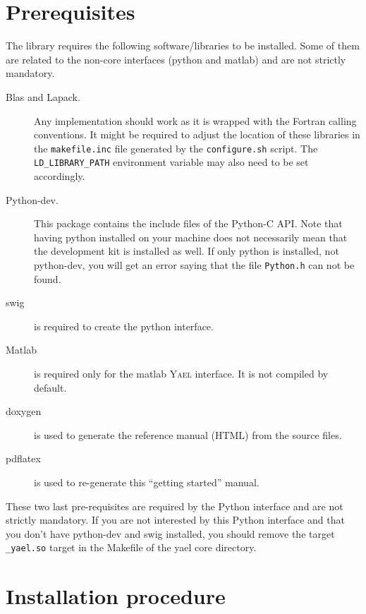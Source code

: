 \documentclass[a4paper,11pt,notitlepage,final,twoside]{report}
\newcommand{\yael}{\textsc{Yael}\xspace}
\newcommand{\tc}[1]{\texttt{#1}}
\begin{document}
\section{Prerequisites}

The library requires the following software/libraries to be installed. 
Some of them are related to the non-core interfaces (python and matlab) 
and are not strictly mandatory. 

\begin{description}
\item [Blas and Lapack.] Any implementation should work as it is
wrapped with the Fortran calling conventions. 
It might be required to adjust the location of these libraries in 
the \tc{makefile.inc} file generated by the \tc{configure.sh} script. 
The \tc{LD\_LIBRARY\_PATH} environment variable may also need to be set accordingly. 

\item [Python-dev.] This package contains the include files of the Python-C API. 
Note that having python installed on your machine does not necessarily 
mean that the development kit is installed as well. 
If only python is installed, not python-dev, you will get an error 
saying that the file \tc{Python.h} can not be found. 

\item [swig] 
is required to create the python interface. 

\item [Matlab] is required only for the matlab \yael interface. 
It is not compiled by default. 

\item [doxygen] is used to generate the reference manual (HTML) from the source files. 

\item [pdflatex] is used to re-generate this ``getting started'' manual. 
\end{description}


These two last pre-requisites are required by the Python interface 
and are not strictly mandatory. If you are not interested by this 
Python interface and that you don't have python-dev and swig installed, 
you should remove the target \tc{\_yael.so} target in the Makefile of the 
yael core directory. 


\section{Installation procedure}
\end{document}
